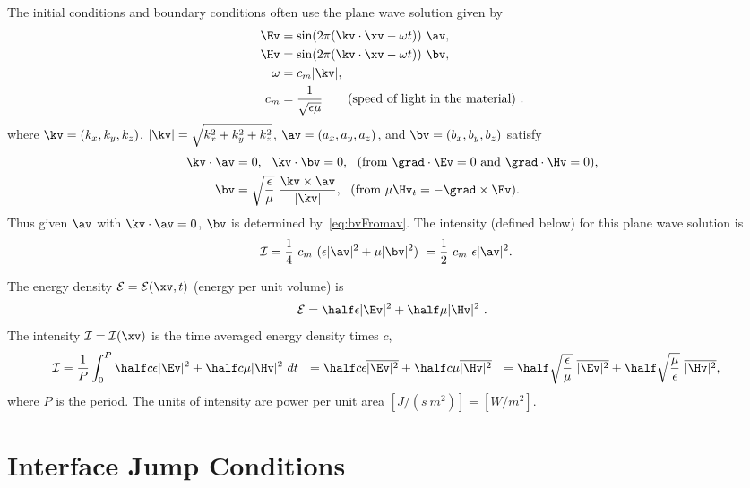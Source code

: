 \documentclass[11pt]{article}
\newcommand{\Ec}{{\mathcal E}}
\newcommand{\Ic}{{\mathcal I}}
\newcommand{\eps}{\epsilon}
\begin{document}
The initial conditions and boundary conditions often use the plane wave solution
given by 
\begin{align*}
  \Ev &= \sin( 2\pi (\kv\cdot\xv - \omega t ))~\av, \\
  \Hv &= \sin( 2\pi (\kv\cdot\xv - \omega t ))~\bv, \\
  \omega & = c_m \vert \kv \vert, \\
  c_m &= { 1 \over \sqrt{ \epsilon \mu}}   \qquad \text{(speed of light in the material)} ~.
\end{align*}
where $\kv=(k_x,k_y,k_z)$, $\vert \kv \vert = \sqrt{ k_x^2 + k_y^2 + k_z^2 }$,
$\av=(a_x,a_y,a_z)$, and $\bv=(b_x,b_y,b_z)$ satisfy 
\begin{align}
  \kv\cdot\av &=0, ~~\kv\cdot\bv=0, ~~\mbox{(from $\grad\cdot\Ev=0$ and $\grad\cdot\Hv=0$)}, \\
  \bv &= \sqrt{\frac{\epsilon}{\mu}}~{\kv\times\av \over \vert \kv \vert}, 
       ~~\mbox{(from $\mu \Hv_t = -\grad\times\Ev$)} .  \label{eq:bvFromav} 
\end{align}
Thus given $\av$ with $\kv\cdot\av =0$, $\bv$ is determined by~\eqref{eq:bvFromav}.
The intensity (defined below) for this plane wave solution is
\begin{align*}
  \Ic &= \frac{1}{4}~c_m~( \epsilon \vert \av\vert^2 + \mu \vert \bv\vert^2 ) 
               ~= \frac{1}{2}~c_m~\epsilon \vert \av\vert^2. 
\end{align*}


% 
The energy density $\Ec=\Ec(\xv,t)$ (energy per unit volume) is 
\begin{equation}
  \Ec = \half \epsilon \vert \Ev \vert^2  + \half \mu \vert \Hv \vert^2 ~.
\end{equation}
The intensity $\Ic=\Ic(\xv)$ is the time averaged energy density times $c$, 
\begin{align*}
  \Ic &= {1\over P} \int_0^P \half c\eps \vert \Ev \vert^2 + \half c \mu \vert \Hv \vert^2  ~dt ~~
       = \half c \eps \overline{\vert \Ev \vert^2} + \half c \mu \overline{\vert \Hv \vert^2} ~~
       = \half\sqrt{ \eps\over \mu}~ \overline{\vert \Ev \vert^2} + 
         \half\sqrt{ \mu\over\eps}~ \overline{\vert \Hv \vert^2},
\end{align*}
where $P$ is the period. The units of intensity are power per unit area $[J/(s~m^2)]=[W/m^2]$.


\section{Interface Jump Conditions}
\end{document}
